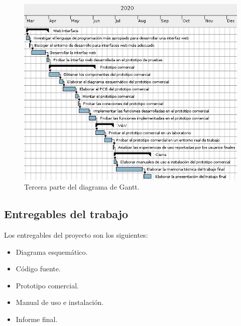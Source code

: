 \begin{figure}[h]
	\centering
	\includegraphics[scale=1]{./Figures/gantt3.png}
	\caption{Tercera parte del diagrama de Gantt.}
	\label{fig:diagramAON}
\end{figure}

\subsection{Entregables del trabajo}

Los entregables del proyecto son los siguientes:
\begin{itemize}
	\item Diagrama esquemático.
	\item Código fuente.
	\item Prototipo comercial.
	\item Manual de uso e instalación.
	\item Informe final.
\end{itemize}

